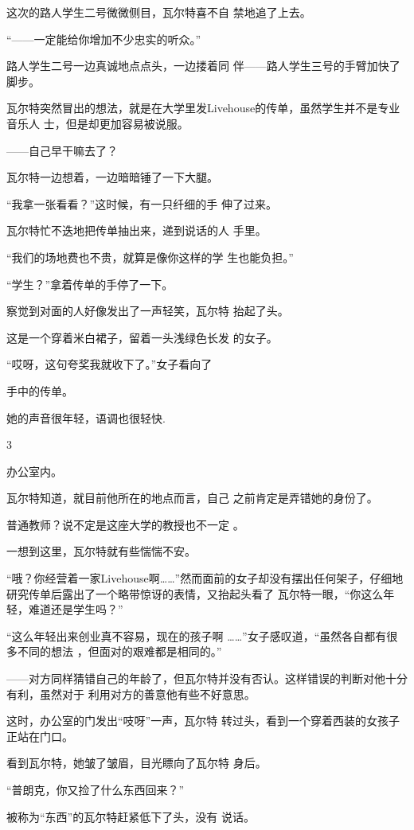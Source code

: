 \documentclass{article}
\begin{document}
这次的路人学生二号微微侧目，瓦尔特喜不自
禁地追了上去。 


“——一定能给你增加不少忠实的听众。” 

路人学生二号一边真诚地点点头，一边搂着同
伴——路人学生三号的手臂加快了脚步。 

瓦尔特突然冒出的想法，就是在大学里发Livehouse的传单，虽然学生并不是专业音乐人
士，但是却更加容易被说服。 


——自己早干嘛去了？ 

\newpage


瓦尔特一边想着，一边暗暗锤了一下大腿。 

“我拿一张看看？”这时候，有一只纤细的手
伸了过来。 

瓦尔特忙不迭地把传单抽出来，递到说话的人
手里。 

“我们的场地费也不贵，就算是像你这样的学
生也能负担。” 


“学生？”拿着传单的手停了一下。 

察觉到对面的人好像发出了一声轻笑，瓦尔特
抬起了头。 

这是一个穿着米白裙子，留着一头浅绿色长发
的女子。 

“哎呀，这句夸奖我就收下了。”女子看向了

\newpage
手中的传单。 


她的声音很年轻，语调也很轻快. 


3 


办公室内。 

瓦尔特知道，就目前他所在的地点而言，自己
之前肯定是弄错她的身份了。 

普通教师？说不定是这座大学的教授也不一定
。 


一想到这里，瓦尔特就有些惴惴不安。 

“哦？你经营着一家Livehouse啊……”然而面前的女子却没有摆出任何架子，仔细地研究传单后露出了一个略带惊讶的表情，又抬起头看了
瓦尔特一眼，“你这么年轻，难道还是学生吗？” 

“这么年轻出来创业真不容易，现在的孩子啊
\newpage
……”女子感叹道，“虽然各自都有很多不同的想法
，但面对的艰难都是相同的。” 

——对方同样猜错自己的年龄了，但瓦尔特并没有否认。这样错误的判断对他十分有利，虽然对于
利用对方的善意他有些不好意思。 

这时，办公室的门发出“吱呀”一声，瓦尔特
转过头，看到一个穿着西装的女孩子正站在门口。 

看到瓦尔特，她皱了皱眉，目光瞟向了瓦尔特
身后。 


“普朗克，你又捡了什么东西回来？” 

被称为“东西”的瓦尔特赶紧低下了头，没有
说话。 
\end{document}
